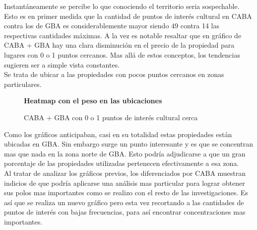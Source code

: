 \documentclass[a4paper, 10pt]{article}
\newcommand\tab[1][0.5cm]{\hspace*{#1}}
\begin{document}
				Instantáneamente se percibe lo que conociendo el territorio seria sospechable. 
				Esto es en primer medida que la cantidad de puntos de interés cultural en 
				CABA contra los de GBA es considerablemente mayor siendo 49 contra 14 las 
				respectivas cantidades máximas. A la vez es notable resaltar que en gráfico 
				de CABA + GBA hay una clara disminución en el precio de la propiedad para 
				lugares con 0 o 1 puntos cercanos. Mas allá de estos conceptos, los tendencias 
				sugieren ser a simple vista constantes.\\ 
				\tab Se trata de ubicar a las propiedades con pocos puntos cercanos en zonas particulares.						 					
				\begin{figure}
    				\centering
    				\textbf{Heatmap con el peso en las ubicaciones}\par\medskip
    				\caption{CABA + GBA con 0 o 1 puntos de interés cultural cerca}
				\end{figure}				
				\FloatBarrier
				
				Como los gráficos anticipaban, casi en su totalidad estas propiedades están ubicadas en GBA. 
				Sin embargo surge un punto interesante y es que se concentran mas que nada en la zona 
				norte de GBA. Esto podría adjudicarse a que un gran porcentaje de las propiedades 
				utilizadas pertenecen efectivamente a esa zona.\\ 

				Al tratar de analizar los gráficos previos, los diferenciados por CABA 
				muestran indicios de que podría aplicarse una análisis mas particular para 
				lograr obtener sus polos mas importantes como se realizo con el resto de las 
				investigaciones. Es así que se realiza un nuevo gráfico pero esta vez 
				recortando a las cantidades de puntos de interés con bajas frecuencias, 
				para así encontrar concentraciones mas importantes.	
				
\end{document}

